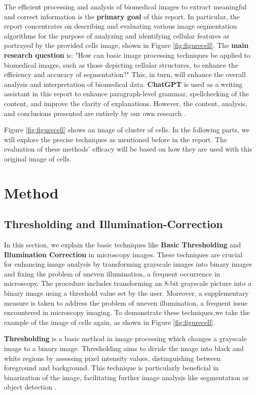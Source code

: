\documentclass[%
	a4paper, %
	12pt, %
	english, %
	bibtotoc %
]{scrartcl}
\begin{document}
The efficient processing and analysis of biomedical images to extract meaningful and correct information is the \textbf{primary goal} of this report. In particular, the report concentrates on describing and evaluating various image segmentation algorithms for the purpose of analyzing and identifying cellular features as portrayed by the provided cells image, shown in Figure \ref{fig:figurecell}. The \textbf{main research question} is: "How can basic image processing techniques be applied to biomedical images, such as those depicting cellular structures, to enhance the efficiency and accuracy of segmentation?" This, in turn, will enhance the overall analysis and interpretation of biomedical data. \textbf{ChatGPT} is used as a writing assistant in this report to enhance paragraph-level grammar, spellchecking of the content, and improve the clarity of explanations. However, the content, analysis, and conclusions presented are entirely by our own research \cite{openai_gpt4}.

Figure \ref{fig:figurecell} shows an image of cluster of cells. In the following parts, we will explore the precise techniques as mentioned before in the report. The evaluation of these methods' efficacy will be based on how they are used with this original image of cells.

\section{Method}
\subsection{Thresholding and Illumination-Correction}
\label{sec: thresholding_and_illumination_correction}

In this section, we explain the basic techniques like \textbf{Basic Thresholding} and \textbf{Illumination Correction} in microscopy images. These techniques are crucial for enhancing image analysis by transforming grayscale images into binary images and fixing the problem of uneven illumination, a frequent occurrence in microscopy. The procedure includes transforming an 8-bit grayscale picture into a binary image using a threshold value set by the user. Moreover, a supplementary measure is taken to address the problem of uneven illumination, a frequent issue encountered in microscopy imaging. To demonstrate these techniques,we take the example of the image of cells again, as shown in Figure \ref{fig:figurecell}.

\textbf{Thresholding} is a basic method in image processing which changes a grayscale image to a binary image. Thresholding aims to divide the image into black and white regions by assessing pixel intensity values, distinguishing between foreground and background. This technique is particularly beneficial in binarization of the image, facilitating further image analysis like segmentation or object detection \cite{gonzalez_digital_image_processing}.
\end{document}
